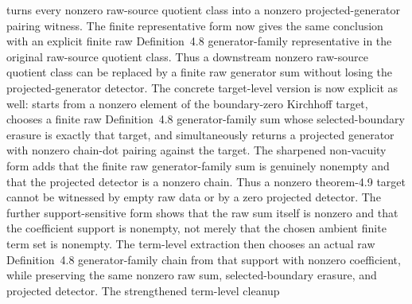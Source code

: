 \documentclass[11pt]{article}
\begin{document}
turns every nonzero raw-source quotient class into a nonzero projected-generator
pairing witness.  The finite representative form
now gives the same conclusion with an explicit finite raw Definition~4.8
generator-family representative in the original raw-source quotient class.
Thus a downstream nonzero raw-source quotient class can be replaced by a finite
raw generator sum without losing the projected-generator detector.  The
concrete target-level version is now explicit as well:
starts from a nonzero element of the boundary-zero Kirchhoff target, chooses a
finite raw Definition~4.8 generator-family sum whose selected-boundary erasure
is exactly that target, and simultaneously returns a projected generator with
nonzero chain-dot pairing against the target.  The sharpened non-vacuity form
adds that the finite raw generator-family sum is genuinely nonempty and that
the projected detector is a nonzero chain.  Thus a nonzero theorem-4.9 target
cannot be witnessed by empty raw data or by a zero projected detector.  The
further support-sensitive form
shows that the raw sum itself is nonzero and that the coefficient support is
nonempty, not merely that the chosen ambient finite term set is nonempty.  The
term-level extraction
then chooses an actual raw Definition~4.8 generator-family chain from that
support with nonzero coefficient, while preserving the same nonzero raw sum,
selected-boundary erasure, and projected detector.  The strengthened
term-level cleanup
\end{document}
